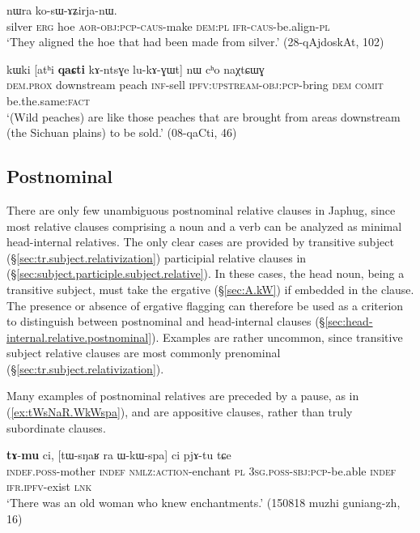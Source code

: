 \begin{exe}
\ex \label{ex:qaR.thWkAsWBzu}
 nɯra ko-sɯ-ɤʑirja-nɯ. \\
silver \textsc{erg} hoe \textsc{aor}-\textsc{obj}:\textsc{pcp}-\textsc{caus}-make \textsc{dem}:\textsc{pl} \textsc{ifr}-\textsc{caus}-be.align-\textsc{pl} \\
\glt `They aligned the hoe that had been made from silver.' (28-qAjdoskAt, 102)
\end{exe}  

\begin{exe}
\ex \label{ex:kAntsGe.lukAGWt}
\gll kɯki [atʰi \textbf{qaɕti} kɤ-ntsɣe lu-kɤ-ɣɯt] nɯ cʰo naχtɕɯɣ \\
\textsc{dem}.\textsc{prox} downstream peach \textsc{inf}-sell \textsc{ipfv}:\textsc{upstream}-\textsc{obj}:\textsc{pcp}-bring \textsc{dem} \textsc{comit} be.the.same:\textsc{fact} \\
\glt `(Wild peaches) are like those peaches that are brought from areas downstream (the Sichuan plains) to be sold.' (08-qaCti, 46)
\end{exe}  
 
 \subsection{Postnominal} \label{sec:postnominal.relative}
 There are only few unambiguous postnominal relative clauses in Japhug, since most relative clauses comprising a noun and a verb can be analyzed as minimal head-internal relatives. The only clear cases are provided by transitive subject (§\ref{sec:tr.subject.relativization}) participial relative clauses in  (§\ref{sec:subject.participle.subject.relative}). In these cases, the head noun, being a transitive subject,  must take the ergative  (§\ref{sec:A.kW}) if embedded in the clause. The presence or absence of ergative flagging can therefore be used as a criterion to distinguish between postnominal and head-internal clauses (§\ref{sec:head-internal.relative.postnominal}). Examples are rather uncommon, since transitive subject relative clauses are most commonly prenominal (§\ref{sec:tr.subject.relativization}). 

Many examples of postnominal relatives are preceded by a pause, as in (\ref{ex:tWsNaR.WkWspa}), and are appositive clauses, rather than truly subordinate clauses. 

 \begin{exe}
\ex \label{ex:tWsNaR.WkWspa}
\gll \textbf{tɤ}-\textbf{mu} ci, [tɯ-sŋaʁ ra ɯ-kɯ-spa] ci pjɤ-tu tɕe \\
\textsc{indef}.\textsc{poss}-mother \textsc{indef} \textsc{nmlz}:\textsc{action}-enchant \textsc{pl} \textsc{3sg}.\textsc{poss}-\textsc{sbj}:\textsc{pcp}-be.able \textsc{indef} \textsc{ifr}.\textsc{ipfv}-exist \textsc{lnk} \\
\glt `There was an old woman who knew enchantments.' (150818 muzhi guniang-zh, 16)
\end{exe}
 
